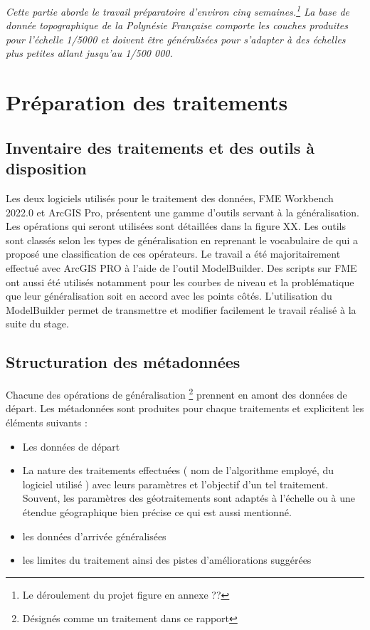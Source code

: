 
\textit{Cette partie aborde le travail préparatoire d'environ cinq semaines.\footnote{Le déroulement du projet figure en annexe ??} La base de donnée topographique de la Polynésie Française comporte les couches produites pour l'échelle 1/5000 et doivent être généralisées pour s'adapter à des échelles plus petites allant jusqu'au 1/500 000.}




\section{Préparation des traitements}
\subsection{Inventaire des traitements et des outils à disposition}

Les deux logiciels utilisés pour le traitement des données, FME Workbench 2022.0 et ArcGIS Pro, présentent une gamme d'outils servant à la généralisation. Les opérations qui seront utilisées sont détaillées dans la figure XX. Les outils sont classés selon les types de généralisation en reprenant le vocabulaire de \cite{Mustiere2001} qui a proposé une classification de ces opérateurs.
Le travail a été majoritairement effectué avec ArcGIS PRO à l'aide de l'outil ModelBuilder. Des scripts sur FME ont aussi été utilisés notamment pour les courbes de niveau et la problématique que leur généralisation soit en accord avec les points côtés. 
L’utilisation du ModelBuilder permet de transmettre et modifier facilement le travail réalisé à la suite du stage. 

\subsection{Structuration des métadonnées}

Chacune des opérations de généralisation \footnote{Désignés comme un traitement dans ce rapport} prennent en amont des données de départ. Les métadonnées sont produites pour chaque traitements et explicitent les éléments suivants :
\begin{itemize}
\item Les données de départ 
\item La nature des traitements effectuées ( nom de l'algorithme employé, du logiciel utilisé ) avec leurs paramètres et l'objectif d'un tel traitement. Souvent, les paramètres des géotraitements sont adaptés à l'échelle ou à une étendue géographique bien précise ce qui est aussi mentionné.
\item les données d'arrivée généralisées
\item les limites du traitement ainsi des pistes d'améliorations suggérées
\end{itemize}

